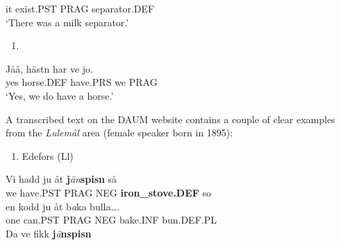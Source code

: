 it  exist.PST  PRAG  separator.DEF\\ %


‘There was a milk separator.’ 
\z


\begin{enumerate} %
\item 
\end{enumerate} %
Jåå,  hästn  har  ve  jo.\\


yes  horse.DEF  have.PRS  we  PRAG\\ %


‘Yes, we do have a horse.’ 
\z


A transcribed text on the DAUM website contains a couple of clear examples from the \textit{Lulemål} area (female speaker born in 1895):

\begin{enumerate} %
\item 
Edefors (Ll)

\end{enumerate} %
\ea\label{}
\gll Vi  hadd  ju  åt  \textbf{j}\textit{än}\textbf{spisn} så\\


we  have.PST  PRAG  NEG  \textbf{iron\_stove.DEF} so\\ %


\ea\label{}
\gll en  kodd  ju  åt  b\textit{a}ka  bulla….\\


one  can.PST  PRAG  NEG  bake.INF  bun.DEF.PL\\ %


\ea\label{}
\gll Da  ve  fikk  \textbf{j}\textit{ä}\textbf{nspisn}\\


